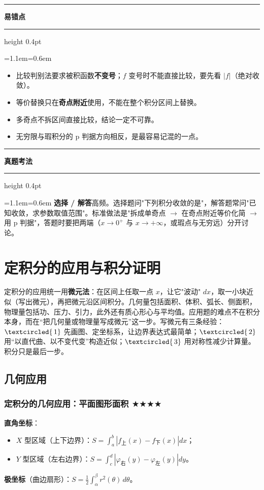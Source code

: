 \documentclass[11pt,openany,UTF8]{ctexbook}
\newcommand{\circled}[1]{\textcircled{\scriptsize\,#1}}
\newcommand{\callouthead}[2]{%
  \par\addvspace{7pt}\noindent
  {\color{#1}\rule[-0.15em]{3pt}{1.05em}}\hspace{0.5em}%
  {\bfseries\color{#1}#2}\par\nobreak\vspace{-0.35em}%
  {\color{rulesep}\hrule height 0.4pt}\nobreak\vspace{0.45em}%
  \begingroup\small\setlength{\parindent}{0pt}%
  \leftskip=1.1em\rightskip=0.6em\noindent\ignorespaces}
\newcommand{\calloutend}{\par\endgroup\addvspace{7pt}}
\newenvironment{callwarn}[1]{\callouthead{warnbar}{#1}}{\calloutend}
\newenvironment{callexam}[1]{\callouthead{exambar}{#1}}{\calloutend}
\begin{document}
\begin{callwarn}{易错点}
\begin{itemize}
\item 比较判别法要求被积函数\textbf{不变号}；$f$ 变号时不能直接比较，要先看 $\lvert f\rvert$（绝对收敛）。
\item 等价替换只在\textbf{奇点附近}使用，不能在整个积分区间上替换。
\item 多奇点不拆区间直接比较，结论一定不可靠。
\item 无穷限与瑕积分的 p 判据方向相反，是最容易记混的一点。
\end{itemize}
\end{callwarn}

\begin{callexam}{真题考法}
\textbf{选择 / 解答}高频。选择题问"下列积分收敛的是"，解答题常问"已知收敛，求参数取值范围"。标准做法是"拆成单奇点 $\to$ 在奇点附近等价化简 $\to$ 用 p 判据"，答题时要把两端（$x\to0^+$ 与 $x\to+\infty$，或瑕点与无穷远）分开讨论。

\end{callexam}

\section{定积分的应用与积分证明}

定积分的应用统一用\textbf{微元法}：在区间上任取一点 $x$，让它"波动" $dx$，取一小块近似（写出微元），再把微元沿区间积分。几何量包括面积、体积、弧长、侧面积，物理量包括功、压力、引力，此外还有质心形心与平均值。应用题的难点不在积分本身，而在“把几何量或物理量写成微元”这一步。写微元有三条经验：$\circled{1}$ 先画图、定坐标系，让边界表达式最简单；$\circled{2}$ 用“以直代曲、以不变代变”构造近似；$\circled{3}$ 用对称性减少计算量。积分只是最后一步。

\subsection{几何应用}

\subsubsection{定积分的几何应用：平面图形面积 $\bigstar$$\bigstar$$\bigstar$$\bigstar$}

\textbf{直角坐标}：

\begin{itemize}
\item $X$ 型区域（上下边界）：$S=\displaystyle\int_a^b\left\lvert f_{\text{上}}(x)-f_{\text{下}}(x)\right\rvert dx$；
\item $Y$ 型区域（左右边界）：$S=\displaystyle\int_c^d\left\lvert\varphi_{\text{右}}(y)-\varphi_{\text{左}}(y)\right\rvert dy$。
\end{itemize}
\textbf{极坐标}（曲边扇形）：$S=\displaystyle\frac{1}{2}\int_{\alpha}^{\beta}r^2(\theta)\,d\theta$。
\end{document}
